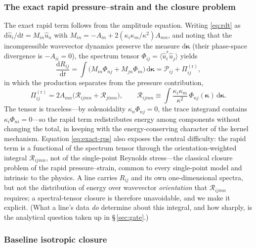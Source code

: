 \documentclass[lineno]{JFM-FLM_Au}
\begin{document}
\subsubsection{The exact rapid pressure--strain and the closure problem}
\label{sec:closure-problem}

The exact rapid term follows from the amplitude equation. Writing
\eqref{eq:rdt} as $\mathrm{d}\hat u_i/\mathrm{d}t=M_{in}\hat u_n$ with
$M_{in}=-A_{in}+2(\kappa_i\kappa_m/\kappa^2)A_{mn}$, and noting that the
incompressible wavevector dynamics preserve the measure
$\mathrm{d}\boldsymbol{\kappa}$ (their phase-space divergence is
$-A_{ii}=0$), the spectrum tensor
$\Phi_{ij}=\langle\hat u_i^{*}\hat u_j\rangle$ yields
\begin{equation}
  \frac{\mathrm{d}R_{ij}}{\mathrm{d}t}
  = \int\!\big(M_{in}\Phi_{nj}+M_{jn}\Phi_{in}\big)\,
    \mathrm{d}\boldsymbol{\kappa}
  = \mathcal{P}_{ij} + \Pi^{(\mathrm r)}_{ij},
  \label{eq:dRdt-rdt}
\end{equation}
in which the production separates from the pressure contribution,
\begin{equation}
  \Pi^{(\mathrm r)}_{ij}
  = 2A_{mn}\big(\mathcal{R}_{ijmn}+\mathcal{R}_{jimn}\big),
  \qquad
  \mathcal{R}_{ijmn} \equiv
  \int \frac{\kappa_i \kappa_m}{\kappa^2}\,
  \Phi_{nj}(\boldsymbol{\kappa})\,\mathrm{d}\boldsymbol{\kappa}.
  \label{eq:exact-rps}
\end{equation}
The tensor is traceless---by solenoidality $\kappa_n\Phi_{nj}=0$, the
trace integrand contains $\kappa_i\Phi_{ni}=0$---so the rapid term
redistributes energy among components without changing the total, in
keeping with the energy-conserving character of the kernel mechanism.
Equation \eqref{eq:exact-rps} also exposes the central difficulty: the
rapid term is a functional of the spectrum tensor through the
orientation-weighted integral $\mathcal{R}_{ijmn}$, not of the
single-point Reynolds stress---the classical closure problem of the rapid
pressure--strain, common to every single-point model
\citep{Crow1968,LaunderReeceRodi1975,Pope2000} and intrinsic to the
physics. A line carries $R_{ij}$ and its own one-dimensional spectra, but
not the distribution of energy over wavevector \emph{orientation} that
$\mathcal{R}_{ijmn}$ requires; a spectral-tensor closure is therefore
unavoidable, and we make it explicit. (What a line's data \emph{do}
determine about this integral, and how sharply, is the analytical
question taken up in \S\,\ref{sec:gate}.)

\subsubsection{Baseline isotropic closure}\label{sec:iso-closure}
\end{document}
